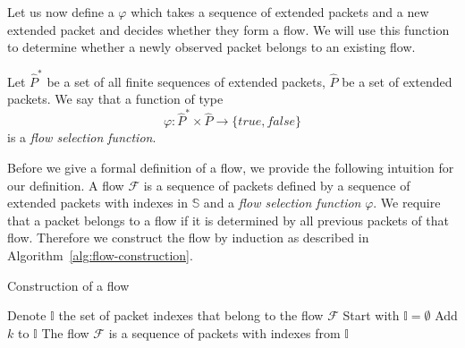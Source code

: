 Let us now define a \emph{} $\varphi$ which takes a sequence of extended packets and a new extended packet and decides whether they form a flow. We will use this function to determine whether a newly observed packet belongs to an existing flow.
\begin{defn}\label{def:flow-selection-function}
Let $\widehat{P}^*$ be a set of all finite sequences of extended packets, $\widehat{P}$ be a set of extended packets. We say that a function of type
\begin{equation*}
    \varphi: \widehat{P}^*\times \widehat{P} \to \{true,false\}
\end{equation*}
is a \emph{flow selection function}.
\end{defn}

Before we give a formal definition of a flow, we provide the following intuition for our definition. A flow $\mathcal{F}$ is a sequence of packets defined by a sequence of extended packets with indexes in $\mathbb{S}$ and a \emph{flow selection function} $\varphi$. We require that a packet belongs to a flow if it is determined by all previous packets of that flow. Therefore we construct the flow by induction as described in Algorithm~\ref{alg:flow-construction}.

\begin{algorithm}
    \caption{Construction of a flow}
    \label{alg:flow-construction}
    \begin{algorithmic}[1]
        \STATE Denote $\mathbb{I}$ the set of packet indexes that belong to the flow $\mathcal{F}$
        \STATE Start with $\mathbb{I} = \emptyset$
            \STATE Add $k$ to $\mathbb{I}$
        \ENDWHILE
        \STATE The flow $\mathcal{F}$ is a sequence of packets with indexes from $\mathbb{I}$
    \end{algorithmic}
\end{algorithm}

